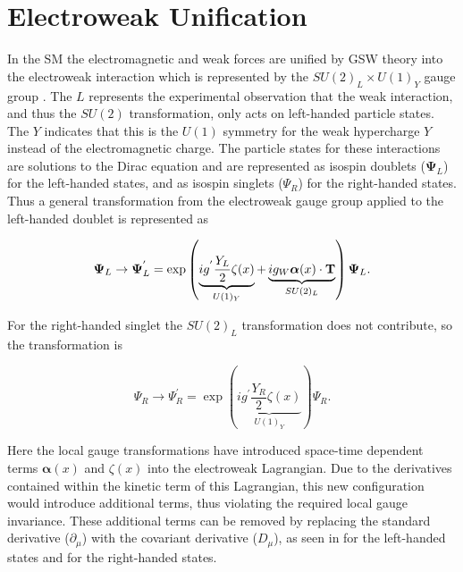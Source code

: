 \section{Electroweak Unification} \label{sec:theory:gsw}

In the SM the electromagnetic and weak forces are unified by GSW theory into
the electroweak interaction which is represented by the $SU(2)_L \times U(1)_Y$
gauge group \cite{Glashow:1961tr, Goldstone:1962es, Weinberg:1967tq}.
The $L$ represents the experimental observation that the weak interaction, and
thus the $SU(2)$ transformation, only acts on left-handed particle states.  The
$Y$ indicates that this is the $U(1)$ symmetry for the weak hypercharge $Y$
instead of the electromagnetic charge.  The particle states for these
interactions are solutions to the Dirac equation and are represented as isospin
doublets ($\boldsymbol{\Psi}_{L}$) for the left-handed states, and as isospin
singlets ($\Psi_R$) for the right-handed states.  Thus a general transformation
from the electroweak gauge group applied to the left-handed doublet is
represented as

\begin{equation} \label{eq:gsw:doublet} 
\boldsymbol{\Psi}_{L} \rightarrow \boldsymbol{\Psi}_{L}^{'} = \exp \left(
\underbrace{ ig^{'} \frac{Y_L}{2}
\zeta (x) }_{U(1)_Y} + \underbrace{ ig_{W} \boldsymbol{\alpha}(x) \cdot
\text{\bf{T}} }_{SU(2)_L} \right) \boldsymbol{\Psi}_{L}.
\end{equation}

For the right-handed singlet the $SU(2)_L$ transformation does not contribute,
so the transformation is

\begin{equation} \label{eq:gsw:singlet} 
{\Psi_R} \rightarrow \Psi_R^{'} = \exp \left( \underbrace{ ig^{'} \frac{Y_R}{2}
\zeta (x) }_{U(1)_Y} \right) \Psi_R.
\end{equation}

Here the local gauge transformations have introduced space-time dependent terms
$\boldsymbol{\alpha}(x)$ and $\zeta(x)$ into the electroweak Lagrangian.  Due
to the derivatives contained within the kinetic term of this Lagrangian, this
new configuration would introduce additional terms, thus violating the required
local gauge invariance.  These additional terms can be removed by replacing the
standard derivative ($\partial_{\mu}$) with the covariant derivative
($D_{\mu}$), as seen in  for the left-handed states and
 for the right-handed states.

